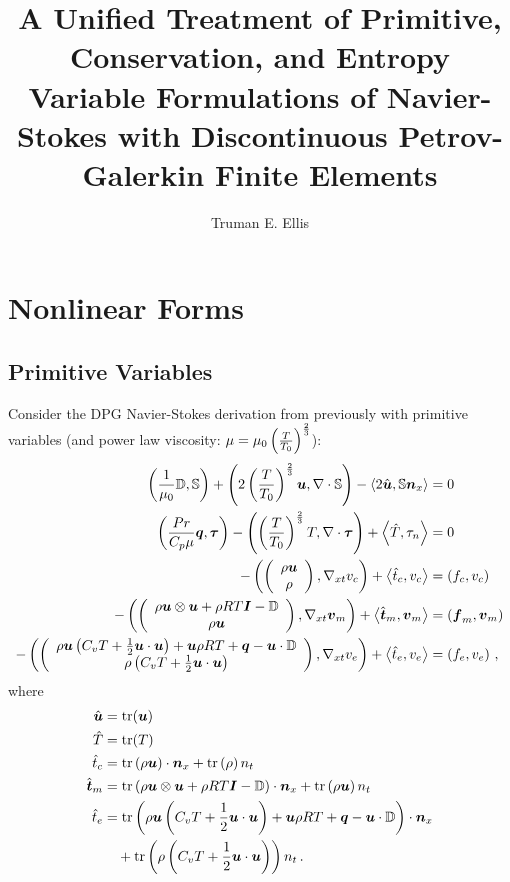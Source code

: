 \documentclass{article}
\title{A Unified Treatment of Primitive, Conservation, and Entropy Variable Formulations 
of Navier-Stokes with Discontinuous Petrov-Galerkin Finite Elements}
\author{Truman E. Ellis}
\begin{document}
\maketitle

\section*{Nonlinear Forms}
\subsection*{Primitive Variables}
Consider the DPG Navier-Stokes derivation from previously with primitive variables (and power law viscosity: $\mu=\mu_0\LRp{\frac{T}{T_0}}^{\frac{2}{3}}$):
\begin{subequations}
\label{eq:compressibleNSBF}
\begin{align}
	\LRp{\frac{1}{\mu_0}\mathbb{D},\mathbb{S}}+\LRp{2\LRp{\frac{T}{T_0}}^{\frac{2}{3}}\bfu,\Div\mathbb{S}}
	-\LRa{2\hat\bfu,\mathbb{S}\bfn_x}&=0\\
	\LRp{\frac{Pr}{C_p\mu}\bfq,\bftau}-\LRp{\LRp{\frac{T}{T_0}}^{\frac{2}{3}}T,\Div\bftau}+\LRa{\hat T,\tau_n}&=0\\
	-\LRp{\vecttwo{\rho\bfu}{\rho},\Gradxt v_c}+\LRa{\hat t_c,v_c}&=\LRp{f_c,v_c}\\
	-\LRp{\vecttwo{\rho\bfu\otimes\bfu+\rho RT\bfI-\mathbb{D}}{\rho\bfu},\Gradxt\bfv_m}+\LRa{\hat\bft_m,\bfv_m}&=\LRp{\bff_m,\bfv_m}\\
	-\LRp{\vecttwo{\rho\bfu\LRp{C_v T+\frac{1}{2}\bfu\cdot\bfu}+\bfu\rho RT+\bfq-\bfu\cdot\mathbb{D}}{\rho\LRp{C_v T+\frac{1}{2}\bfu\cdot\bfu}},\Gradxt v_e}
	+\LRa{\hat t_e,v_e}&=\LRp{f_e,v_e}\,,
\end{align}
\end{subequations}
where 
\begin{equation*}
\begin{aligned}
\hat\bfu&=\trace(\bfu)\\
\hat T&=\trace(T)\\
\hat t_c&=\trace\LRp{\rho\bfu}\cdot\bfn_x
+\trace\LRp{\rho}n_t\\
\hat\bft_m&=\trace\LRp{\rho\bfu\otimes\bfu+\rho RT\bfI-\mathbb{D}}\cdot\bfn_x
+\trace\LRp{\rho\bfu} n_t\\
\hat t_e&=\trace\LRp{\rho\bfu\LRp{C_v T+\frac{1}{2}\bfu\cdot\bfu}+\bfu\rho RT+\bfq-\bfu\cdot\mathbb{D}}\cdot\bfn_x\\
&\quad+\trace\LRp{\rho\LRp{C_v T+\frac{1}{2}\bfu\cdot\bfu}}n_t\,.
\end{aligned}
\end{equation*}
\end{document}
